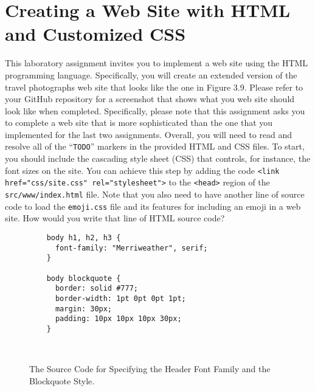 \documentclass[11pt]{article}
\newcommand{\mainprogram}{\lstinline{index.html}}
\newcommand{\mainprogramsource}{\lstinline{src/www/index.html}}
\newcommand{\command}[1]{``\lstinline{#1}''}
\newcommand{\program}[1]{\lstinline{#1}}
\newcommand{\url}[1]{\lstinline{#1}}
\begin{document}
\section*{Creating a Web Site with HTML and Customized CSS}

This laboratory assignment invites you to implement a web site using the HTML
programming language. Specifically, you will create an extended version of the
travel photographs web site that looks like the one in Figure 3.9. Please refer
to your GitHub repository for a screenshot that shows what you web site should
look like when completed. Specifically, please note that this assignment asks
you to complete a web site that is more sophisticated than the one that you
implemented for the last two assignments. Overall, you will need to read and
resolve all of the \command{TODO} markers in the provided HTML and CSS files. To
start, you should include the cascading style sheet (CSS) that controls, for
instance, the font sizes on the site. You can achieve this step by adding the
code \program{<link href="css/site.css" rel="stylesheet">} to the
\program{<head>} region of the \mainprogramsource{} file. Note that you also
need to have another line of source code to load the \program{emoji.css} file
and its features for including an emoji in a web site. How would you write that
line of HTML source code?

\begin{figure}[t]
  \centering
  \begin{verbatim}
    body h1, h2, h3 {
      font-family: "Merriweather", serif;
    }

    body blockquote {
      border: solid #777;
      border-width: 1pt 0pt 0pt 1pt;
      margin: 30px;
      padding: 10px 10px 10px 30px;
    }
  \end{verbatim}
  \vspace*{-.35in}
  \caption{The Source Code for Specifying the Header Font Family and the
  Blockquote Style.}~\label{fig:css}
  \vspace*{-.25in}
\end{figure}

\end{document}
